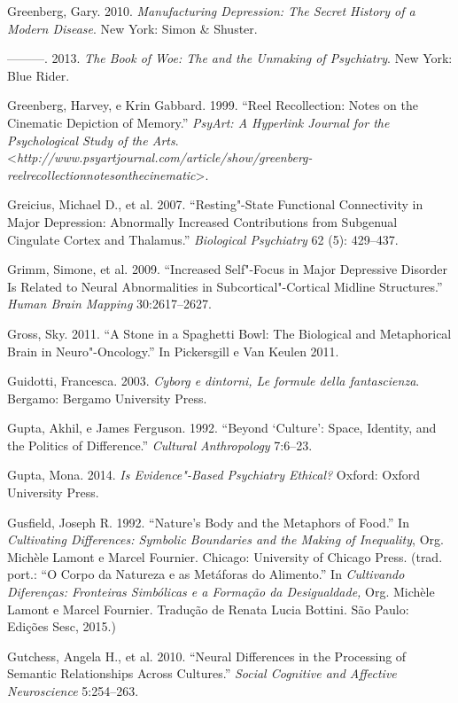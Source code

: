 Greenberg, Gary. 2010. \emph{Manufacturing Depression: The Secret
History of a Modern Disease}. New York: Simon \& Shuster.

---------. 2013. \emph{The Book of Woe: The  and the Unmaking of
Psychiatry}. New York: Blue Rider.

Greenberg, Harvey, e Krin Gabbard. 1999. ``Reel Recollection: Notes on
the Cinematic Depiction of Memory.'' \emph{PsyArt: A Hyperlink Journal
for the Psychological Study of the Arts}.
\textless{}\emph{http://www.psyartjournal.com/article/show/greenberg-reelrecollectionnotesonthecinematic}\textgreater{}.

Greicius, Michael D., et al. 2007. ``Resting"-State Functional
Connectivity in Major Depression: Abnormally Increased Contributions
from Subgenual Cingulate Cortex and Thalamus.'' \emph{Biological
Psychiatry} 62 (5): 429--437.

Grimm, Simone, et al. 2009. ``Increased Self"-Focus in Major Depressive
Disorder Is Related to Neural Abnormalities in Subcortical"-Cortical
Midline Structures.'' \emph{Human Brain Mapping} 30:2617--2627.

Gross, Sky. 2011. ``A Stone in a Spaghetti Bowl: The Biological and
Metaphorical Brain in Neuro"-Oncology.'' In Pickersgill e Van Keulen
2011.

Guidotti, Francesca. 2003. \emph{Cyborg e dintorni, Le formule della
fantascienza}. Bergamo: Bergamo University Press.

Gupta, Akhil, e James Ferguson. 1992. ``Beyond `Culture': Space,
Identity, and the Politics of Difference.'' \emph{Cultural Anthropology}
7:6--23.

Gupta, Mona. 2014. \emph{Is Evidence"-Based Psychiatry Ethical?} Oxford:
Oxford University Press.

Gusfield, Joseph R. 1992. ``Nature's Body and the Metaphors of Food.''
In \emph{Cultivating Differences: Symbolic Boundaries and the Making of
Inequality}, Org. Michèle Lamont e Marcel Fournier. Chicago: University
of Chicago Press. (trad. port.: ``O Corpo da Natureza e as Metáforas do
Alimento.'' In \emph{Cultivando Diferenças: Fronteiras Simbólicas e a
Formação da Desigualdade,} Org. Michèle Lamont e Marcel Fournier.
Tradução de Renata Lucia Bottini. São Paulo: Edições Sesc, 2015.)

Gutchess, Angela H., et al. 2010. ``Neural Differences in the Processing
of Semantic Relationships Across Cultures.'' \emph{Social Cognitive and
Affective Neuroscience} 5:254--263.


